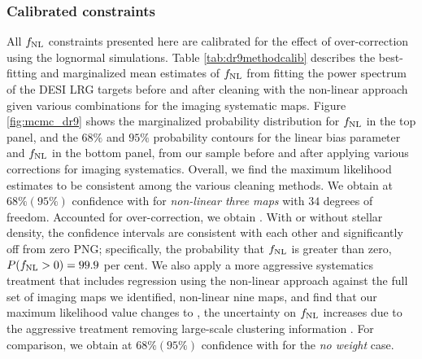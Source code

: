 \subsubsection{Calibrated constraints}
All $f_{\rm NL}$ constraints presented here are calibrated for the effect of over-correction using the lognormal simulations. Table \ref{tab:dr9methodcalib} describes the best-fitting and marginalized mean estimates of $f_{\rm NL}$ from fitting the power spectrum of the DESI LRG targets before and after cleaning with the non-linear approach given various combinations for the imaging systematic maps. Figure \ref{fig:mcmc_dr9} shows the marginalized probability distribution for $f_{\rm NL}$ in the top panel, and the $68\%$ and $95\%$ probability contours for the linear bias parameter and $f_{\rm NL}$ in the bottom panel, from our sample before and after applying various corrections for imaging systematics. Overall, we find the maximum likelihood estimates to be consistent among the various cleaning methods. We obtain  at $68\%(95\%)$ confidence with  for \textit{non-linear three maps} with $34$ degrees of freedom. Accounted for over-correction, we obtain . With or without stellar density, the confidence intervals are consistent with each other and significantly off from zero PNG; specifically, the probability that $f_{\rm NL}$ is greater than zero, $P(f_{\rm NL} >0)=99.9$ per cent. We also apply a more aggressive systematics treatment that includes regression using the non-linear approach against the full set of imaging maps we identified, non-linear nine maps, and find that  our maximum
likelihood value changes  to ,   the uncertainty on $f_{\rm NL}$ increases due
to the aggressive treatment removing large-scale clustering information .  For comparison, we obtain  at $68\% (95\%)$ confidence with  for the \textit{no weight} case.

